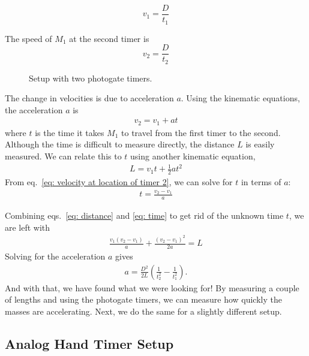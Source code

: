 \documentclass[addpoints]{physlabs}
\begin{document}
\begin{labsection}
\begin{theory}
\begin{equation}\label{eq: velocity at location of timer 1}
    v_1 = \frac{D}{t_1}
\end{equation}

The speed of $M_1$ at the second timer is 
%
\begin{equation}\label{eq: velocity at location of timer 2}
    v_2 = \frac{D}{t_2}
\end{equation}

\begin{figure}
    
    \caption{Setup with two photogate timers.}
    \label{fig: atwood setup digital}
\end{figure}

The change in velocities is due to acceleration $a$. Using the kinematic equations, the acceleration $a$ is
%
\begin{align}\label{eq: velocity at location of timer 2}
    v_2 = v_1 + at
\end{align}
where $t$ is the time it takes $M_1$ to travel from the first timer to the second. Although the time is difficult to measure directly, the distance $L$ is easily measured. We can relate this to $t$ using another kinematic equation,
%
\begin{align}\label{eq: distance}
    L = v_1t + \frac{1}{2}at^2
\end{align}
%
From eq.~\ref{eq: velocity at location of timer 2}, we can solve for $t$ in terms of $a$:
%
\begin{align}\label{eq: time}
    t = \frac{v_2-v_1}{a}
\end{align}

Combining eqs.~\ref{eq: distance} and \ref{eq: time} to get rid of the unknown time $t$, we are left with
%
\begin{align}\label{eq: distance without t}
     \frac{v_1(v_2-v_1)}{a} + \frac{(v_2-v_1)^2}{2a} = L
\end{align}
%
Solving for the acceleration $a$ gives 
%
\begin{align}\label{eq: acceleration}
     a = \frac{D^2}{2L}\left(\frac{1}{t_2^2}-\frac{1}{t_1^2}\right).
\end{align}
%
And with that, we have found what we were looking for! By measuring a couple of lengths and using the photogate timers, we can measure how quickly the masses are accelerating. Next, we do the same for a slightly different setup.

\subsection*{Analog Hand Timer Setup}


\end{theory}
\end{labsection}
\end{document}
